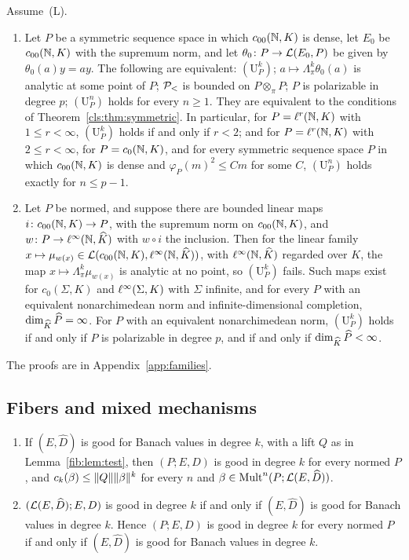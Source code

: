 \begin{theorem}\label{fam2:thm:bases}
Assume~\textup{(L)}.
\begin{enumerate}
\item Let $P$ be a symmetric sequence space in which $c_{00}(\mathbb N,K)$ is dense, let $E_0$ be $c_{00}(\mathbb N,K)$ with the supremum
norm, and let $\theta_0\colon P\to\mathcal L(E_0,P)$ be given by $\theta_0(a)y=ay$. The following are equivalent:
$(\mathrm U^k_P)$; $a\mapsto\Lambda^k_\pi\theta_0(a)$ is analytic at some point of $P$; $\mathcal P_<$ is bounded on $P\otimes_\pi P$;
$P$ is polarizable in degree $p$; $(\mathrm U^n_P)$ holds for every $n\ge1$. They are equivalent to the conditions of
Theorem~\ref{cls:thm:symmetric}. In particular, for $P=\ell^r(\mathbb N,K)$ with $1\le r<\infty$, $(\mathrm U^k_P)$ holds if and
only if $r<2$; and for $P=\ell^r(\mathbb N,K)$ with $2\le r<\infty$, for $P=c_0(\mathbb N,K)$, and for every symmetric sequence space $P$
in which $c_{00}(\mathbb N,K)$ is dense and $\varphi_P(m)^2\le Cm$ for some $C$, $(\mathrm U^n_P)$ holds exactly for $n\le p-1$.
\item Let $P$ be normed, and suppose there are bounded linear maps $i\colon c_{00}(\mathbb N,K)\to P$, with the supremum norm on
$c_{00}(\mathbb N,K)$, and $w\colon P\to\ell^\infty(\mathbb N,\widehat K)$ with $w\circ i$ the inclusion. Then for the linear family
$x\mapsto\mu_{w(x)}\in\mathcal L(c_{00}(\mathbb N,K),\ell^\infty(\mathbb N,\widehat K))$, with $\ell^\infty(\mathbb N,\widehat K)$ regarded over $K$, the map
$x\mapsto\Lambda^k_\pi\mu_{w(x)}$ is analytic at no point, so $(\mathrm U^k_P)$ fails. Such maps exist for $c_0(\Sigma,K)$ and
$\ell^\infty(\Sigma,K)$ with $\Sigma$ infinite, and for every $P$ with an equivalent nonarchimedean norm and infinite-dimensional
completion, $\dim_{\widehat K}\widehat P=\infty$. For $P$ with an equivalent nonarchimedean norm, $(\mathrm U^k_P)$ holds if and
only if $P$ is polarizable in degree $p$, and if and only if $\dim_{\widehat K}\widehat P<\infty$.
\end{enumerate}
\end{theorem}

The proofs are in Appendix~\ref{app:families}.

\subsection{Fibers and mixed mechanisms}\label{fam2:ssec:mixed}

\begin{proposition}\label{fam2:prop:fibers}
\begin{enumerate}
\item If $(E,\widehat D)$ is good for Banach values in degree $k$, with a lift $Q$ as in Lemma~\ref{fib:lem:test}, then
$(P;E,D)$ is good in degree $k$ for every normed $P$, and $c_k(\beta)\le\lVert Q\rVert\lVert \beta\rVert^k$ for every $n$ and
$\beta\in\operatorname{Mult}^n(P;\mathcal L(E,\widehat D))$.
\item $(\mathcal L(E,\widehat D);E,D)$ is good in degree $k$ if and only if $(E,\widehat D)$ is good for Banach values in degree
$k$. Hence $(P;E,D)$ is good in degree $k$ for every normed $P$ if and only if $(E,\widehat D)$ is good for Banach values
in degree $k$.
\end{enumerate}
\end{proposition}

